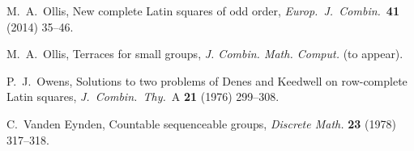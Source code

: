 \documentclass[12pt,a4paper]{article}
\newcommand{\Z}{\mathbb{Z}}
\begin{document}
\begin{thebibliography}{99}
M.~A.~Ollis, New complete Latin squares of odd order, {\em Europ.~J.~Combin.}~{\bf 41} (2014) 35--46.

M.~A.~Ollis, Terraces for small groups, {\em J. Combin. Math. Comput.} (to appear).

P.~J.~Owens,  Solutions to two problems of Denes and Keedwell on row-complete
Latin squares, {\em J.~Combin.~Thy.}~A {\bf 21} (1976) 299--308.




C.~Vanden Eynden, Countable sequenceable groups, {\em Discrete Math.} {\bf 23} (1978) 317--318.








\end{thebibliography}
\end{document}
